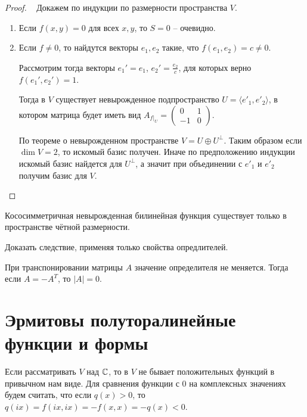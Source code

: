 \begin{proof}~
    Докажем по индукции по размерности пространства $V$. 
    \begin{enumerate}
        \item Если $f(x, y) = 0$ для всех $x, y$, то $S = 0$ -- очевидно.
        \item Если $f \neq 0$, то найдутся векторы $e_1, e_2$ такие, что $f(e_1, e_2) = c \neq 0$. 
        
        Рассмотрим тогда векторы $e_1' = e_1$, $e_2' = \frac{e_2}{c}$, для которых верно $f(e_1', e_2') = 1$.
        
        Тогда в $V$ существует невырожденное подпространство $U = \langle e'_1, e'_2 \rangle$,
        в котором матрица будет иметь вид $A_{f \vert_{U}} = \begin{pmatrix}
            0  &1 \\
            -1 &0
        \end{pmatrix}$.
        
        По теореме о невырожденном пространстве $V = U \oplus U^{\perp}$. Таким образом 
        если $\dim V = 2$, то искомый базис получен. Иначе по предположению
        индукции искомый базис найдется для $U^{\perp}$, а значит при объединении с $e'_1$ и $e'_2$ 
        получим базис для $V$.
    \end{enumerate}
\end{proof}

\begin{corollary}
    Кососимметричная невырожденная билинейная функция существует только в пространстве чётной размерности.
\end{corollary}

\begin{exercise}
    Доказать следствие, применяя только свойства опредлителей.
\end{exercise}

\begin{idea}
    При транспонировании матрицы $A$ значение определителя не меняется. Тогда если $A = - A^T$, то 
    $|A| = 0$.
\end{idea}

\section{Эрмитовы полуторалинейные функции и формы}
\begin{definition}
    Если рассматривать $V$ над $\mathbb{C}$, то в $V$ не бывает положительных функций в привычном нам виде.
    Для сравнения функции с $0$ на комплексных значениях будем считать, что если  $q(x) > 0$, то 
    $q(ix) = f(ix, ix) = -f(x,x) = -q(x) < 0$.
\end{definition}

